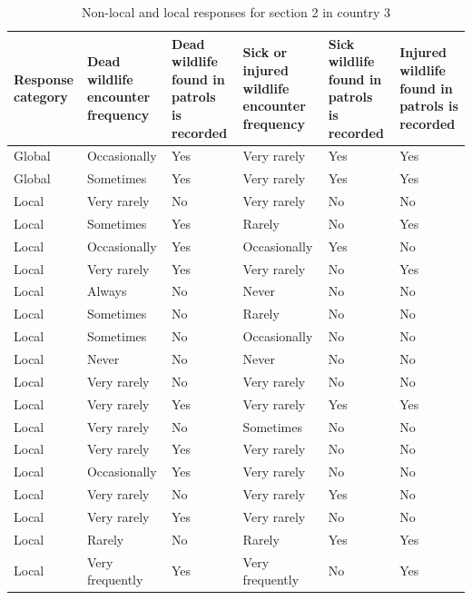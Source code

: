 \documentclass[
  letterpaper,
  DIV=11,
  numbers=noendperiod]{scrartcl}
\begin{document}
\begin{table}[H]

\caption{Non-local and local responses for section 2 in country 3}
\centering
\begin{tabular}[t]{>{\raggedright\arraybackslash}p{2cm}|>{\raggedright\arraybackslash}p{3cm}|>{\raggedright\arraybackslash}p{2cm}|>{\raggedright\arraybackslash}p{3cm}|>{\raggedright\arraybackslash}p{2cm}|>{\raggedright\arraybackslash}p{2cm}}
\hline
Response
category & Dead wildlife
encounter frequency & Dead wildlife
found in patrols
is recorded & Sick or injured wildlife
encounter frequency & Sick wildlife
found in patrols
is recorded & Injured wildlife
found in patrols
is recorded\\
\hline
Global & Occasionally & Yes & Very rarely & Yes & Yes\\
\hline
Global & Sometimes & Yes & Very rarely & Yes & Yes\\
\hline
Local & Very rarely & No & Very rarely & No & \vphantom{3} No\\
\hline
Local & Sometimes & Yes & Rarely & No & Yes\\
\hline
Local & Occasionally & Yes & Occasionally & Yes & No\\
\hline
Local & Very rarely & Yes & Very rarely & No & Yes\\
\hline
Local & Always & No & Never & No & No\\
\hline
Local & Sometimes & No & Rarely & No & No\\
\hline
Local & Sometimes & No & Occasionally & No & No\\
\hline
Local & Never & No & Never & No & No\\
\hline
Local & Very rarely & No & Very rarely & No & \vphantom{2} No\\
\hline
Local & Very rarely & Yes & Very rarely & Yes & Yes\\
\hline
Local & Very rarely & No & Sometimes & No & No\\
\hline
Local & Very rarely & Yes & Very rarely & No & \vphantom{1} No\\
\hline
Local & Occasionally & Yes & Very rarely & No & No\\
\hline
Local & Very rarely & No & Very rarely & Yes & No\\
\hline
Local & Very rarely & Yes & Very rarely & No & No\\
\hline
Local & Rarely & No & Rarely & Yes & Yes\\
\hline
Local & Very frequently & Yes & Very frequently & No & Yes\\

\end{tabular}
\end{table}
\end{document}
